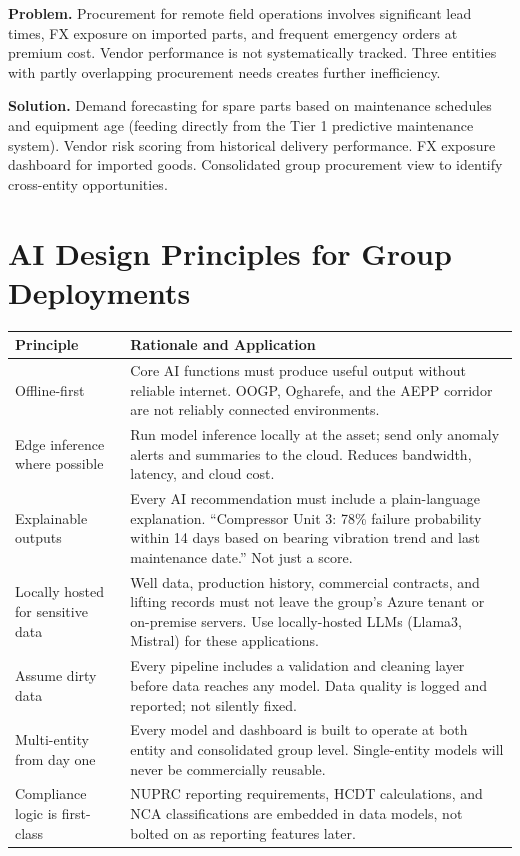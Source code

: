\documentclass[10pt]{article}
\begin{document}
{\small
\textbf{Problem.}
Procurement for remote field operations involves significant lead times, FX exposure
on imported parts, and frequent emergency orders at premium cost. Vendor performance
is not systematically tracked. Three entities with partly overlapping procurement
needs creates further inefficiency.

\vspace{4pt}
\textbf{Solution.}
Demand forecasting for spare parts based on maintenance schedules and equipment age
(feeding directly from the Tier 1 predictive maintenance system). Vendor risk scoring
from historical delivery performance. FX exposure dashboard for imported goods.
Consolidated group procurement view to identify cross-entity opportunities.
}

\vspace{10pt}

\section{AI Design Principles for Group Deployments}

\small
\begin{tabularx}{\columnwidth}{@{}lX@{}}
\toprule
\textbf{Principle} & \textbf{Rationale and Application} \\
\midrule
Offline-first
  & Core AI functions must produce useful output without reliable internet.
    OOGP, Ogharefe, and the AEPP corridor are not reliably connected environments. \\[3pt]
Edge inference where possible
  & Run model inference locally at the asset; send only anomaly alerts and summaries
    to the cloud. Reduces bandwidth, latency, and cloud cost. \\[3pt]
Explainable outputs
  & Every AI recommendation must include a plain-language explanation.
    ``Compressor Unit 3: 78\% failure probability within 14 days based on bearing
    vibration trend and last maintenance date.'' Not just a score. \\[3pt]
Locally hosted for sensitive data
  & Well data, production history, commercial contracts, and lifting records must
    not leave the group's Azure tenant or on-premise servers. Use locally-hosted
    LLMs (Llama3, Mistral) for these applications. \\[3pt]
Assume dirty data
  & Every pipeline includes a validation and cleaning layer before data reaches
    any model. Data quality is logged and reported; not silently fixed. \\[3pt]
Multi-entity from day one
  & Every model and dashboard is built to operate at both entity and consolidated
    group level. Single-entity models will never be commercially reusable. \\[3pt]
Compliance logic is first-class
  & NUPRC reporting requirements, HCDT calculations, and NCA classifications are
    embedded in data models, not bolted on as reporting features later. \\
\bottomrule
\end{tabularx}
\normalsize
\end{document}
